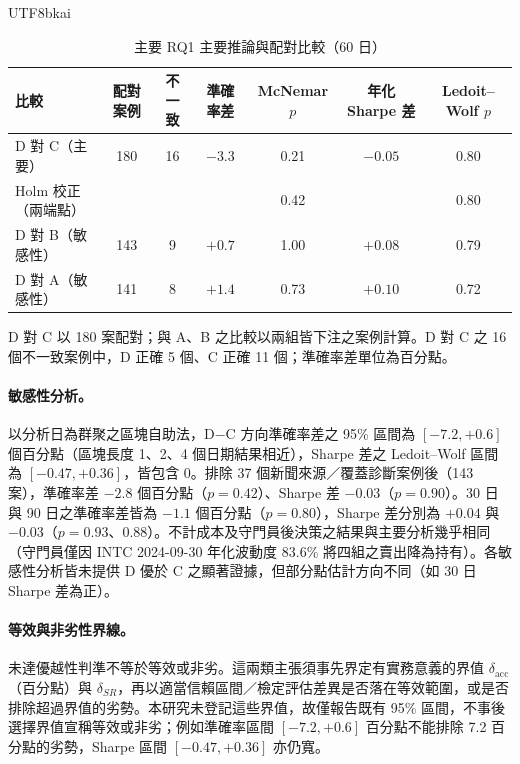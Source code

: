 \documentclass[12pt,a4paper]{article}
\newcommand{\grp}[1]{\textsf{#1}}
\begin{document}
\begin{CJK}{UTF8}{bkai}
\begin{table}[H]
\centering\footnotesize
\caption{主要 RQ1 主要推論與配對比較（60 日）}
\label{tab:formaltests}
\begin{tabular}{@{}lcccccc@{}}
\toprule
比較 & 配對案例 & 不一致 & 準確率差 & McNemar $p$ & 年化 Sharpe 差 & Ledoit--Wolf $p$ \\
\midrule
\grp{D} 對 \grp{C}（主要） & 180 & 16 & $-3.3$ & 0.21 & $-0.05$ & 0.80 \\
\quad Holm 校正（兩端點） & & & & 0.42 & & 0.80 \\
\grp{D} 對 \grp{B}（敏感性） & 143 & 9 & $+0.7$ & 1.00 & $+0.08$ & 0.79 \\
\grp{D} 對 \grp{A}（敏感性） & 141 & 8 & $+1.4$ & 0.73 & $+0.10$ & 0.72 \\
\bottomrule
\end{tabular}
\par\smallskip
\raggedright\footnotesize \grp{D} 對 \grp{C} 以 180 案配對；與 \grp{A}、\grp{B} 之比較以兩組皆下注之案例計算。\grp{D} 對 \grp{C} 之 16 個不一致案例中，\grp{D} 正確 5 個、\grp{C} 正確 11 個；準確率差單位為百分點。
\end{table}

\paragraph{敏感性分析。} 以分析日為群聚之區塊自助法，\grp{D}$-$\grp{C} 方向準確率差之 95\% 區間為 $[-7.2, +0.6]$ 個百分點（區塊長度 1、2、4 個日期結果相近），Sharpe 差之 Ledoit--Wolf 區間為 $[-0.47, +0.36]$，皆包含 0。排除 37 個新聞來源／覆蓋診斷案例後（143 案），準確率差 $-2.8$ 個百分點（$p=0.42$）、Sharpe 差 $-0.03$（$p=0.90$）。30 日與 90 日之準確率差皆為 $-1.1$ 個百分點（$p=0.80$），Sharpe 差分別為 $+0.04$ 與 $-0.03$（$p=0.93$、$0.88$）。不計成本及守門員後決策之結果與主要分析幾乎相同（守門員僅因 INTC 2024-09-30 年化波動度 83.6\% 將四組之賣出降為持有）。各敏感性分析皆未提供 \grp{D} 優於 \grp{C} 之顯著證據，但部分點估計方向不同（如 30 日 Sharpe 差為正）。

\paragraph{等效與非劣性界線。} 未達優越性判準不等於等效或非劣。這兩類主張須事先界定有實務意義的界值 $\delta_{\mathrm{acc}}$（百分點）與 $\delta_{SR}$，再以適當信賴區間／檢定評估差異是否落在等效範圍，或是否排除超過界值的劣勢。本研究未登記這些界值，故僅報告既有 95\% 區間，不事後選擇界值宣稱等效或非劣；例如準確率區間 $[-7.2,+0.6]$ 百分點不能排除 7.2 百分點的劣勢，Sharpe 區間 $[-0.47,+0.36]$ 亦仍寬。


\end{CJK}
\end{document}
